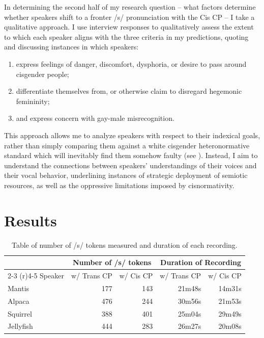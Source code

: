 \documentclass[12pt,twoside]{reedthesis}
\begin{document}
In determining the second half of my research question -- what factors determine whether speakers shift to a fronter /s/ pronunciation with the Cis CP -- I take a qualitative approach. I use interview responses to qualitatively assess the extent to which each speaker aligns with the three criteria in my predictions, quoting and discussing instances in which speakers:
\begin{enumerate}
 \item express feelings of danger, discomfort, dysphoria, or desire to pass around cisgender people;
 \item differentiate themselves from, or otherwise claim to disregard hegemonic femininity;
 \item and express concern with gay-male misrecognition.
\end{enumerate}
This approach allows me to analyze speakers with respect to their indexical goals, rather than simply comparing them against a white cisgender heteronormative standard which will inevitably find them somehow faulty (see \cite{calder_interrogating_2025, zimman_beyond_2021}). Instead, I aim to understand the connections between speakers' understandings of their voices and their vocal behavior, underlining instances of strategic deployment of semiotic resources, as well as the oppressive limitations imposed by cisnormativity.

\chapter{Results}
\begin{table}[h]
\centering
\begin{tabular}{l r r r r}
\toprule
		  & \multicolumn{2}{c}{Number of /s/ tokens}  &  \multicolumn{2}{c}{Duration of Recording}\\\cmidrule(r){2-3} \cmidrule(r){4-5}
Speaker & w/ Trans CP & w/ Cis CP & w/ Trans CP & w/ Cis CP \\ \midrule
Mantis    &       177 &       143 &       21m48s &     14m31s \\
Alpaca    &       476 &       244 &       30m56s &     21m53s \\
Squirrel  &       388 &       401 &       25m04s &     29m49s \\
Jellyfish &       444 &       283 &       26m27s &     20m08s \\
 \bottomrule
\end{tabular}
\caption{Table of number of /s/ tokens measured and duration of each recording.}
\label{table_recordings}
\end{table}
\end{document}
